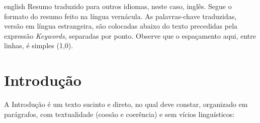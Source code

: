 \documentclass[
	12pt,				%
	oneside,			%
	a4paper,			%
	chapter=TITLE,		%
	section=TITLE,		%
	english,			%
	brazil,				%
	]{abntex2}
\begin{document}
\begin{resumo}[Abstract]
    \begin{otherlanguage*}{english}
        Resumo traduzido para outros idiomas, neste caso, inglês. Segue o formato do resumo feito na língua vernácula. As palavras-chave traduzidas, versão em língua estrangeira, são colocadas abaixo do texto precedidas pela expressão \emph{Keywords}, separadas por ponto. Observe que o espaçamento aqui, entre linhas, é simples (1,0).
    \end{otherlanguage*}

\end{resumo}

% 
%
%  

\imprimirlistafiguras

\imprimirlistaquadros

\imprimirlistatabelas



\imprimirsumario


\textual

\chapter{Introdução}
\label{Chap:intro}

A Introdução é um texto sucinto e direto, no qual deve constar, organizado em parágrafos, com textualidade (coesão e coerência) e sem vícios linguísticos:
\end{document}
